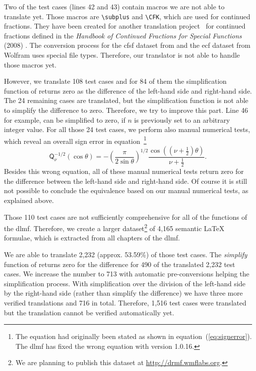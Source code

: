 Two of the test cases (lines 42 and 43) contain macros we are not able to translate yet. Those macros are \verb|\subplus| and \verb|\CFK|, which are used for continued fractions. They have been created for another translation project~\parencite[§5]{CICM:Paper} for continued fractions defined in the \textit{Handbook of Continued Fractions for Special Functions} (2008) \parencite{CF:Handbook}. The conversion process for the \gls{cfsf} \parencite{CF:Maple} dataset from \Maple{} and the \gls{ecf} \parencite{CF:eCF,eCF:FinalReport} dataset from Wolfram uses special file types. Therefore, our translator is not able to handle those macros yet.

However, we translate 108 test cases and for 84 of them the simplification function of \Maple{} returns zero as the difference of the left-hand side and right-hand side. The 24 remaining cases are translated, but the simplification function is not able to simplify the difference to zero. Therefore, we try to improve this part. Line 46~\parencite[(18.5.10)]{NIST:DLMF} for example, can be simplified to zero, if $n$ is previously set to an arbitrary integer value. For all those 24 test cases, we perform also manual numerical tests, which reveal an overall sign error in equation~\parencite[(14.5.14)]{NIST:DLMF}\footnote{The equation had originally been stated as shown in equation~(\ref{eq:signerror}). The \gls{dlmf} has fixed the wrong equation with version 1.0.16.}
\begin{equation}\label{eq:signerror}
\displaystyle \mathsf{Q}^{-1/2}_{\nu}\left(\cos\theta\right)=-\left(\frac{\pi}{2\sin\theta}\right)^{1/2}\frac{\cos\left(\left(\nu+\frac{1}{2}\right)\theta\right)}{\nu+\frac{1}{2}}.
\end{equation}
Besides this wrong equation, all of these manual numerical tests return zero for the difference between the left-hand side and right-hand side. Of course it is still not possible to conclude the equivalence based on our manual numerical tests, as explained above.

Those 110 test cases are not sufficiently comprehensive for all of the functions of the \gls{dlmf}. Therefore, we create a larger dataset\footnote{We are planning to publish this dataset at \url{http://drmf.wmflabs.org}.} of 4,165 semantic \LaTeX{} formulae, which is extracted from all chapters of the \gls{dlmf}. 

We are able to translate 2,232 (approx. 53.59\%) of those test cases. The \textit{simplify} function of \Maple{} returns zero for the difference for 490 of the translated 2,232 test cases. We increase the number to 713 with automatic pre-conversions helping the simplification process. With simplification over the division of the left-hand side by the right-hand side (rather than simplify the difference) we have three more verified translations and 716 in total. Therefore, 1,516 test cases were translated but the translation cannot be verified automatically yet.

